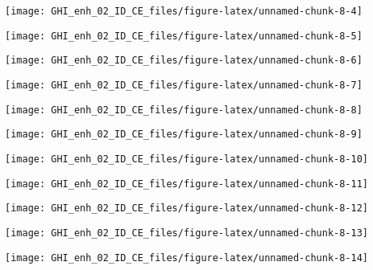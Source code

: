 \documentclass[
  10pt,
  a4paper,oneside]{article}
\begin{document}
\begin{center}\texttt{[image: GHI\_enh\_02\_ID\_CE\_files/figure-latex/unnamed-chunk-8-4]} \end{center}

\begin{center}\texttt{[image: GHI\_enh\_02\_ID\_CE\_files/figure-latex/unnamed-chunk-8-5]} \end{center}

\begin{center}\texttt{[image: GHI\_enh\_02\_ID\_CE\_files/figure-latex/unnamed-chunk-8-6]} \end{center}

\begin{center}\texttt{[image: GHI\_enh\_02\_ID\_CE\_files/figure-latex/unnamed-chunk-8-7]} \end{center}

\begin{center}\texttt{[image: GHI\_enh\_02\_ID\_CE\_files/figure-latex/unnamed-chunk-8-8]} \end{center}

\begin{center}\texttt{[image: GHI\_enh\_02\_ID\_CE\_files/figure-latex/unnamed-chunk-8-9]} \end{center}

\begin{center}\texttt{[image: GHI\_enh\_02\_ID\_CE\_files/figure-latex/unnamed-chunk-8-10]} \end{center}

\begin{center}\texttt{[image: GHI\_enh\_02\_ID\_CE\_files/figure-latex/unnamed-chunk-8-11]} \end{center}

\begin{center}\texttt{[image: GHI\_enh\_02\_ID\_CE\_files/figure-latex/unnamed-chunk-8-12]} \end{center}

\begin{center}\texttt{[image: GHI\_enh\_02\_ID\_CE\_files/figure-latex/unnamed-chunk-8-13]} \end{center}

\begin{center}\texttt{[image: GHI\_enh\_02\_ID\_CE\_files/figure-latex/unnamed-chunk-8-14]} \end{center}
\end{document}
